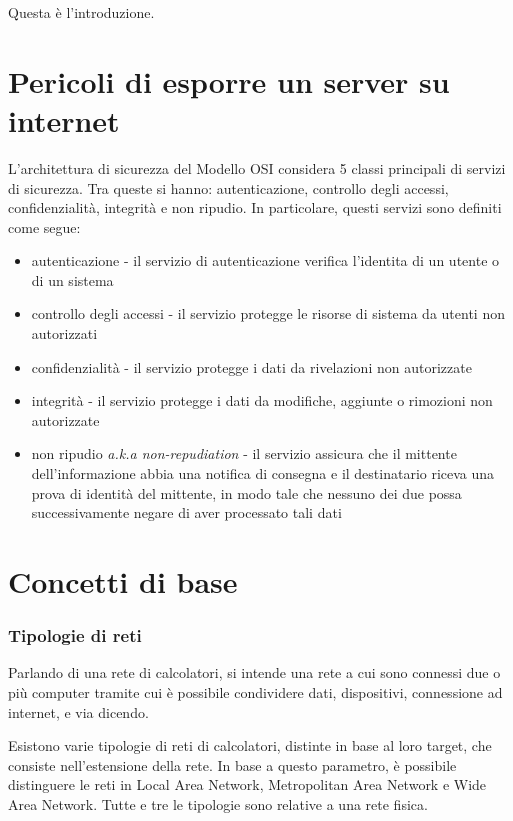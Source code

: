 Questa è l'introduzione.

\section{Pericoli di esporre un server su internet}

L'architettura di sicurezza del Modello OSI considera 5 classi principali di servizi di sicurezza. Tra queste si hanno: autenticazione, controllo degli accessi, confidenzialità, integrità e non ripudio.
In particolare, questi servizi sono definiti come segue:
\begin{itemize}
    \item autenticazione - il servizio di autenticazione verifica l'identita di un utente o di un sistema
    \item controllo degli accessi - il servizio protegge le risorse di sistema da utenti non autorizzati
    \item confidenzialità - il servizio protegge i dati da rivelazioni non autorizzate
    \item integrità - il servizio protegge i dati da modifiche, aggiunte o rimozioni non autorizzate
    \item non ripudio \emph{a.k.a non-repudiation} - il servizio assicura che il mittente dell'informazione abbia una notifica di consegna e il destinatario riceva una prova di identità del mittente, in modo tale che nessuno dei due possa successivamente negare di aver processato tali dati
\end{itemize}


\section{Concetti di base}
\subsubsection{Tipologie di reti}
Parlando di una rete di calcolatori, si intende una rete a cui sono connessi due o più computer tramite cui è possibile condividere dati, dispositivi, connessione ad internet, e via dicendo.

Esistono varie tipologie di reti di calcolatori, distinte in base al loro target, che consiste nell'estensione della rete. In base a questo parametro, è possibile distinguere le reti in Local Area Network, Metropolitan Area Network e Wide Area Network. Tutte e tre le tipologie sono relative a una rete fisica.

